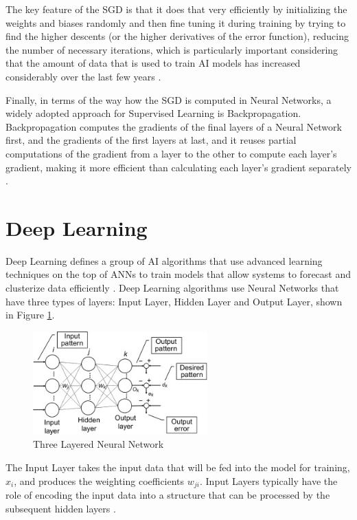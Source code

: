 \documentclass[openright]{normas-utf-tex} %
\begin{document}
The key feature of the SGD is that it does that very efficiently by initializing the weights
and biases randomly and then fine tuning it during training by trying to find the higher descents 
(or the higher derivatives of the error function), reducing the number of necessary iterations, 
which is particularly important considering that the amount of data that is used to train AI
models has increased considerably over the last few years \cite{CornellSGD}.

Finally, in terms of the way how the SGD is computed in Neural Networks, a widely adopted approach 
for Supervised Learning is Backpropagation. Backpropagation computes the gradients of the final 
layers of a Neural Network first, and the gradients of the first layers at last, 
and it reuses partial computations of the gradient from a layer to the other to compute each layer's 
gradient, making it more efficient than calculating each layer's gradient separately \cite{BrilliantBackpropagation}. 

\section{Deep Learning}

Deep Learning defines a group of AI algorithms that use advanced learning techniques on the 
top of ANNs to train models that allow systems to forecast and clusterize data 
efficiently \cite{IBMDeepLearning}.
Deep Learning algorithms use Neural Networks that have three types of layers:
Input Layer, Hidden Layer and Output Layer, shown in Figure \ref{fig:threeLayeredAnn}.
        
\begin{figure}[H]
	\centering
	\includegraphics[width=0.6\textwidth]{./images/three-layered-ann.jpg}
	\caption[Three Layered Neural Network]{Three Layered Neural Network}
	\label{fig:threeLayeredAnn}
\end{figure}

The Input Layer takes the input data that will be fed into the model for training,
$x_i$, and produces the weighting coefficients $w_{ji}$. Input Layers
typically have the role of encoding the input data into a structure that can be processed by the 
subsequent hidden layers \cite{Paranjape2020}.
\end{document}
